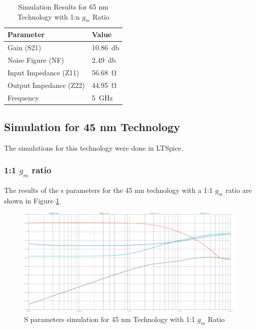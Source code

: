 \begin{table}[H]
    \centering
    \caption{Simulation Results for 65 nm Technology with 1:n $g_m$ Ratio}
    \begin{tabularx}{\textwidth}{>{\centering\arraybackslash}X >{\centering\arraybackslash}X }
        \toprule
        \textbf{Parameter} & \textbf{Value}\\
        \midrule
        Gain (S21) & \SI{10.86}{\decibel} \\
        \midrule
        Noise Figure (NF) & \SI{2.49}{\decibel} \\
        \midrule
        Input Impedance (Z11) & \SI{56.68}{\ohm} \\
        \midrule
        Output Impedance (Z22) & \SI{44.95}{\ohm} \\
        \midrule
        Frequency & \SI{5}{\giga \hertz} \\
        \bottomrule
    \end{tabularx}
    \label{tab:65nm_1ton_results}
\end{table}

\subsection{Simulation for 45 nm Technology}

The simulations for this technology were done in LTSpice.
\subsubsection{1:1 $g_m$ ratio}

The results of the s parameters for the 45 nm technology with a 1:1 $g_m$ ratio are shown in Figure \ref{fig:SParam45nm1to1}. 
\begin{figure}[H]
    \centering
    \includegraphics[width=1\textwidth]{Images/SParam_45_1To1.png}
    \caption{S parameters simulation for 45 nm Technology with 1:1 $g_m$ Ratio}
    \label{fig:SParam45nm1to1}
\end{figure}

